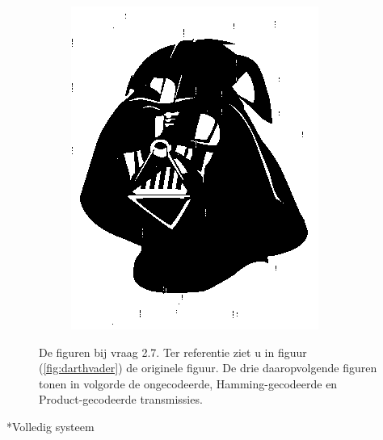 \documentclass[]{article}
\begin{document}
\begin{section}
\begin{subsection}
\begin{figure}
\begin{subfigure}{0.4\textwidth}
                \includegraphics[width=\textwidth]{prod_coded.png}
                \caption{}
                \label{fig:prod_coded}
            \end{subfigure}

            \caption{De figuren bij vraag 2.7. Ter referentie ziet u in
                figuur (\ref{fig:darthvader}) de originele figuur. De
                drie daaropvolgende figuren tonen in volgorde de
                ongecodeerde, Hamming-gecodeerde en Product-gecodeerde
            transmissies.}

            \label{fig:2_7}

        \end{figure}

    \end{subsection}

\end{section}

\begin{section}*{Volledig systeem} %
\end{section}
\end{document}
